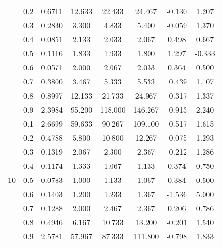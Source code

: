 \documentclass[11pt,a4paper]{report}
\begin{document}
\begin{longtable}{ | c | c || c | c | c | c | c | c | }
 & 0.2 & 0.6711 & 12.633 & 22.433 & 24.467 & -0.130 & 1.207 \\
 & 0.3 & 0.2830 & 3.300 & 4.833 & 5.400 & -0.059 & 1.370 \\
 & 0.4 & 0.0851 & 2.133 & 2.033 & 2.067 & 0.498 & 0.667 \\
 & 0.5 & 0.1116 & 1.833 & 1.933 & 1.800 & 1.297 & -0.333 \\
 & 0.6 & 0.0571 & 2.000 & 2.067 & 2.033 & 0.364 & 0.500 \\
 & 0.7 & 0.3800 & 3.467 & 5.333 & 5.533 & -0.439 & 1.107 \\
 & 0.8 & 0.8997 & 12.133 & 21.733 & 24.967 & -0.317 & 1.337 \\
 & 0.9 & 2.3984 & 95.200 & 118.000 & 146.267 & -0.913 & 2.240 \\
 \hline
\multirow{9}{*}{10} & 0.1 & 2.6699 & 59.633 & 90.267 & 109.100 & -0.517 & 1.615 \\
 & 0.2 & 0.4788 & 5.800 & 10.800 & 12.267 & -0.075 & 1.293 \\
 & 0.3 & 0.1319 & 2.067 & 2.300 & 2.367 & -0.212 & 1.286 \\
 & 0.4 & 0.1174 & 1.333 & 1.067 & 1.133 & 0.374 & 0.750 \\
 & 0.5 & 0.0783 & 1.000 & 1.133 & 1.067 & 0.384 & 0.500 \\
 & 0.6 & 0.1403 & 1.200 & 1.233 & 1.367 & -1.536 & 5.000 \\
 & 0.7 & 0.1288 & 2.000 & 2.467 & 2.367 & 0.206 & 0.786 \\
 & 0.8 & 0.4946 & 6.167 & 10.733 & 13.200 & -0.201 & 1.540 \\
 & 0.9 & 2.5781 & 57.967 & 87.333 & 111.800 & -0.798 & 1.833 \\
 \hline
\hline
\end{longtable}
\end{document}
